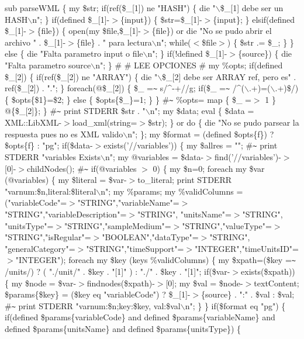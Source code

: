 \documentclass{article}
\begin{document}
sub parseWML
\{
	my \$str;
	if(ref(\$\_[1]) ne "HASH") \{
		die "$\backslash$\$\_[1] debe ser un HASH$\backslash$n";
	\}
	if(defined \$\_[1]-$>$\{input\}) \{
		\$str=\$\_[1]-$>$\{input\};
	\} elsif(defined \$\_[1]-$>$\{file\}) \{
		open(my \$file,\$\_[1]-$>$\{file\}) or die "No se pudo abrir el archivo " . \$\_[1]-$>$\{file\} . " para lectura$\backslash$n";
		while($<$\$file$>$) 
		\{
			\$str .= \$\_;
		\}
	\} else \{
		die "Falta parametro input o file$\backslash$n";
	\}
	if(!defined \$\_[1]-$>$\{source\}) \{
		die "Falta parametro source$\backslash$n";
	\}
	\#
	\# LEE OPCIONES
	\#
	my \%opts;
	if(defined \$\_[2]) \{
		if(ref(\$\_[2]) ne "ARRAY") \{
			die "$\backslash$\$\_[2] debe ser ARRAY ref, pero es" . ref(\$\_[2]) . ".";
		\}
		foreach(@\$\_[2]) \{
			\$\_ =\texttt{\~{}} s/\^{}-+//g;
			if(\$\_ =\texttt{\~{}} /\^{}($\backslash$.+)=($\backslash$.+)\$/) \{
				\$opts\{\$1\}=\$2;
			\} else \{
				\$opts\{\$\_\}=1;
			\}
		\}
		\#\texttt{\~{}} \%opts= map \{ \$\_ =$>$ 1 \} @\{\$\_[2]\};
	\}
	\#\texttt{\~{}} print STDERR \$str . "$\backslash$n";
	my \$data;
	eval \{
		\$data = XML::LibXML-$>$load\_xml(string=$>$\$str);
	\} or do \{
		die "No se pudo parsear la respuesta pues no es XML valido$\backslash$n";
	\};
	my \$format = (defined \$opts\{f\}) ? \$opts\{f\} : "pg";
	if(\$data-$>$exists('//variables')) \{
		my \$allres = "";
		\#\texttt{\~{}} print STDERR "variables Exists$\backslash$n";
		my @variables = \$data-$>$find('//variables')-$>$[0]-$>$childNodes();
		\#\texttt{\~{}} if(@variables $>$ 0) \{
		my \$n=0;
		foreach my \$var (@variables) \{
			my \$literal = \$var-$>$to\_literal;
			print STDERR "varnum:\$n,literal:\$literal$\backslash$n";
			my \%params;
			my \%validColumns = ("variableCode"=$>$"STRING","variableName"=$>$"STRING","variableDescription"=$>$"STRING", "unitsName"=$>$"STRING", "unitsType"=$>$"STRING","sampleMedium"=$>$"STRING","valueType"=$>$"STRING","isRegular"=$>$"BOOLEAN","dataType"=$>$"STRING", "generalCategory"=$>$"STRING","timeSupport"=$>$"INTEGER","timeUnitsID"=$>$"INTEGER");
			foreach my \$key (keys \%validColumns) \{
				my \$xpath=(\$key =\texttt{\~{}} /units/) ? ( "./unit/" . \$key . "[1]" ) : "./" . \$key . "[1]";
				if(\$var-$>$exists(\$xpath)) \{
					my \$node = \$var-$>$findnodes(\$xpath)-$>$[0];
					my \$val = \$node-$>$textContent;
					\$params\{\$key\} = (\$key eq "variableCode") ? \$\_[1]-$>$\{source\} . ":" .  \$val : \$val;
					\#\texttt{\~{}} print STDERR "varnum:\$n;key:\$key, val:\$val$\backslash$n";
				\}
			\}
			if(\$format eq "pg") \{
				if(defined \$params\{variableCode\} and defined \$params\{variableName\} and defined \$params\{unitsName\} and defined  \$params\{unitsType\}) \{ 
\end{document}
